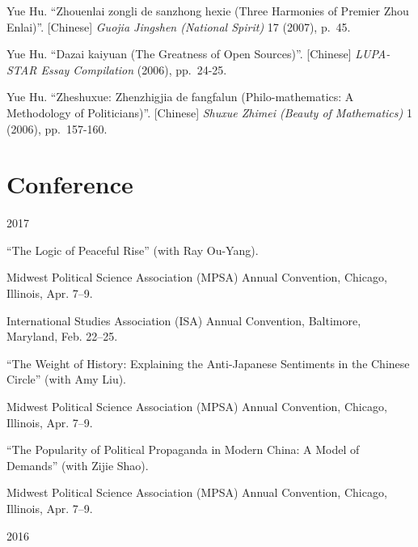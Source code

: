 \documentclass[10.5pt,]{article}
\providecommand{\tightlist}{%
  \setlength{\itemsep}{0pt}\setlength{\parskip}{0pt}}
\renewenvironment{itemize}{
  \begin{list}{}{
    \setlength{\leftmargin}{1.5em}
  }
}{
  \end{list}
}
\begin{document}
Yue Hu. ``Zhouenlai zongli de sanzhong hexie (Three Harmonies of Premier
Zhou Enlai)''. {[}Chinese{]} \emph{Guojia Jingshen (National Spirit)} 17
(2007), p.~45.

Yue Hu. ``Dazai kaiyuan (The Greatness of Open Sources)''. {[}Chinese{]}
\emph{LUPA-STAR Essay Compilation} (2006), pp.~24-25.

Yue Hu. ``Zheshuxue: Zhenzhigjia de fangfalun (Philo-mathematics: A
Methodology of Politicians)''. {[}Chinese{]}
\emph{Shuxue Zhimei (Beauty of Mathematics)} 1 (2006), pp.~157-160.

\section{Conference}\label{conference}

\begin{itemize}
\tightlist
\item
  2017

  \begin{itemize}
  \tightlist
  \item
    ``The Logic of Peaceful Rise'' (with Ray Ou-Yang).

    \begin{itemize}
    \tightlist
    \item
      \footnotesize Midwest Political Science Association (MPSA) Annual
      Convention, Chicago, Illinois, Apr. 7--9.
    \item
      \footnotesize International Studies Association (ISA) Annual
      Convention, Baltimore, Maryland, Feb. 22--25.
    \end{itemize}
  \item
    ``The Weight of History: Explaining the Anti-Japanese Sentiments in
    the Chinese Circle'' (with Amy Liu).

    \begin{itemize}
    \tightlist
    \item
      \footnotesize Midwest Political Science Association (MPSA) Annual
      Convention, Chicago, Illinois, Apr. 7--9.
    \end{itemize}
  \item
    ``The Popularity of Political Propaganda in Modern China: A Model of
    Demands'' (with Zijie Shao).

    \begin{itemize}
    \tightlist
    \item
      \footnotesize Midwest Political Science Association (MPSA) Annual
      Convention, Chicago, Illinois, Apr. 7--9.
    \end{itemize}
  \end{itemize}
\item
  2016


\end{itemize}
\end{document}
